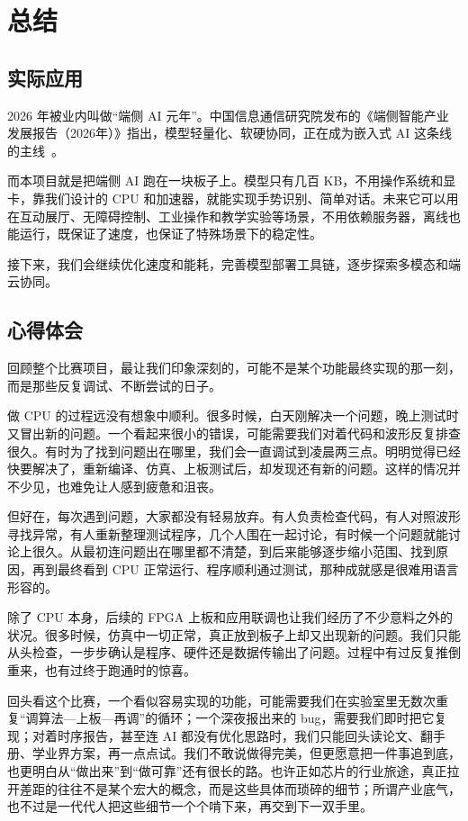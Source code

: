 \documentclass[UTF8,a4paper,12pt,fontset=none,scheme=plain]{ctexart}
\begin{document}
\clearpage
\section{总结}
\subsection{实际应用}
2026 年被业内叫做“端侧 AI 元年”。中国信息通信研究院发布的《端侧智能产业发展报告（2026年）》指出，模型轻量化、软硬协同，正在成为嵌入式 AI 这条线的主线~\cite{caict2026edge}。

而本项目就是把端侧 AI 跑在一块板子上。模型只有几百 KB，不用操作系统和显卡，靠我们设计的 CPU 和加速器，就能实现手势识别、简单对话。未来它可以用在互动展厅、无障碍控制、工业操作和教学实验等场景，不用依赖服务器，离线也能运行，既保证了速度，也保证了特殊场景下的稳定性。

接下来，我们会继续优化速度和能耗，完善模型部署工具链，逐步探索多模态和端云协同。

\subsection{心得体会}
回顾整个比赛项目，最让我们印象深刻的，可能不是某个功能最终实现的那一刻，而是那些反复调试、不断尝试的日子。

做 CPU 的过程远没有想象中顺利。很多时候，白天刚解决一个问题，晚上测试时又冒出新的问题。一个看起来很小的错误，可能需要我们对着代码和波形反复排查很久。有时为了找到问题出在哪里，我们会一直调试到凌晨两三点。明明觉得已经快要解决了，重新编译、仿真、上板测试后，却发现还有新的问题。这样的情况并不少见，也难免让人感到疲惫和沮丧。

但好在，每次遇到问题，大家都没有轻易放弃。有人负责检查代码，有人对照波形寻找异常，有人重新整理测试程序，几个人围在一起讨论，有时候一个问题就能讨论上很久。从最初连问题出在哪里都不清楚，到后来能够逐步缩小范围、找到原因，再到最终看到 CPU 正常运行、程序顺利通过测试，那种成就感是很难用语言形容的。

除了 CPU 本身，后续的 FPGA 上板和应用联调也让我们经历了不少意料之外的状况。很多时候，仿真中一切正常，真正放到板子上却又出现新的问题。我们只能从头检查，一步步确认是程序、硬件还是数据传输出了问题。过程中有过反复推倒重来，也有过终于跑通时的惊喜。

回头看这个比赛，一个看似容易实现的功能，可能需要我们在实验室里无数次重复“调算法—上板—再调”的循环；一个深夜报出来的 bug，需要我们即时把它复现；对着时序报告，甚至连 AI 都没有优化思路时，我们只能回头读论文、翻手册、学业界方案，再一点点试。我们不敢说做得完美，但更愿意把一件事追到底，也更明白从“做出来”到“做可靠”还有很长的路。也许正如芯片的行业旅途，真正拉开差距的往往不是某个宏大的概念，而是这些具体而琐碎的细节；所谓产业底气，也不过是一代代人把这些细节一个个啃下来，再交到下一双手里。
\end{document}
